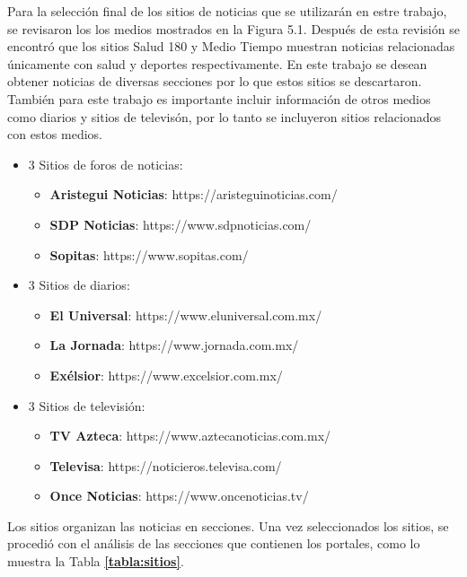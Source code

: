 Para la selección final de los sitios de noticias que se utilizarán en estre trabajo, se revisaron los los medios mostrados en la Figura 5.1. Después de esta revisión se encontró que los sitios Salud 180 y Medio Tiempo muestran noticias relacionadas únicamente con salud y deportes respectivamente. En este trabajo se desean obtener noticias de diversas secciones por lo que estos sitios se descartaron. También para este trabajo es importante incluir información de otros medios como diarios y  sitios de televisón, por lo tanto se incluyeron sitios relacionados con estos medios.

\begin{itemize}
    \item 3 Sitios de foros de noticias: 
    \begin{itemize}
      \item \textbf{Aristegui Noticias}: https://aristeguinoticias.com/
      \item \textbf{SDP Noticias}: https://www.sdpnoticias.com/
      \item \textbf{Sopitas}: https://www.sopitas.com/
    \end{itemize}
    \item 3 Sitios de diarios:
    \begin{itemize}
      \item \textbf{El Universal}: https://www.eluniversal.com.mx/
      \item \textbf{La Jornada}: https://www.jornada.com.mx/
      \item \textbf{Exélsior}: https://www.excelsior.com.mx/
    \end{itemize}
    \item 3 Sitios de televisión:
    \begin{itemize}
      \item \textbf{TV Azteca}: https://www.aztecanoticias.com.mx/
      \item \textbf{Televisa}: https://noticieros.televisa.com/
      \item \textbf{Once Noticias}: https://www.oncenoticias.tv/
    \end{itemize}
\end{itemize}

Los sitios organizan las noticias en secciones. Una vez seleccionados los sitios, se procedió con el análisis de las secciones que contienen los portales, como 
lo muestra la Tabla \textbf{\ref{tabla:sitios}}.

